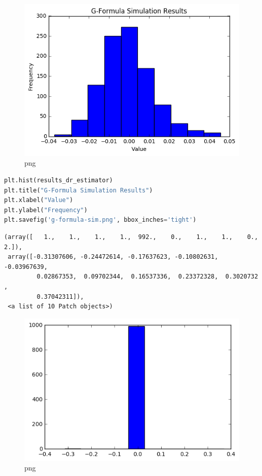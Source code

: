 \begin{figure}
\centering
\includegraphics{Final Iteration_files/Final Iteration_31_0.png}
\caption{png}
\end{figure}

\begin{lstlisting}[language=Python]
plt.hist(results_dr_estimator)
plt.title("G-Formula Simulation Results")
plt.xlabel("Value")
plt.ylabel("Frequency")
plt.savefig('g-formula-sim.png', bbox_inches='tight')
\end{lstlisting}

\begin{lstlisting}
(array([   1.,    1.,    1.,    1.,  992.,    0.,    1.,    1.,    0.,    2.]),
 array([-0.31307606, -0.24472614, -0.17637623, -0.10802631, -0.03967639,
         0.02867353,  0.09702344,  0.16537336,  0.23372328,  0.3020732 ,
         0.37042311]),
 <a list of 10 Patch objects>)
\end{lstlisting}

\begin{figure}
\centering
\includegraphics{Final Iteration_files/Final Iteration_32_1.png}
\caption{png}
\end{figure}

